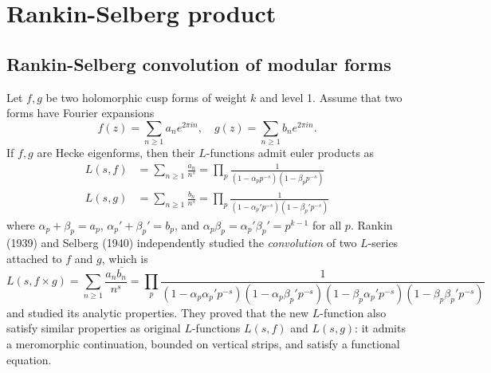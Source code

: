 \section{Rankin-Selberg product}

\subsection{Rankin-Selberg convolution of modular forms}

Let $f, g$ be two holomorphic cusp forms of weight $k$ and level 1.
Assume that two forms have Fourier expansions
$$
    f(z) = \sum_{n\geq 1} a_{n}e^{2\pi i n}, \quad g(z) = \sum_{n\geq 1} b_{n}e^{2\pi i n}.
$$
If $f,g$ are Hecke eigenforms, then their $L$-functions admit euler products as
\begin{align*}
    L(s, f) &= \sum_{n\geq 1}\frac{a_{n}}{n^{s}} = \prod_{p} \frac{1}{(1 - \alpha_{p}p^{-s})(1 - \beta_{p}p^{-s})} \\
    L(s, g) &= \sum_{n\geq 1}\frac{b_{n}}{n^{s}} = \prod_{p} \frac{1}{(1 - \alpha_{p}'p^{-s})(1 - \beta_{p}'p^{-s})}
\end{align*}
where $\alpha_{p} + \beta_{p} = a_{p}$, $\alpha_{p}' + \beta_{p}' = b_{p}$, and $\alpha_{p}\beta_{p} = \alpha_{p}'\beta_{p}' = p^{k-1}$ for all $p$.
Rankin (1939) and Selberg (1940) independently studied the \emph{convolution} of two $L$-series attached to $f$ and $g$, which is
$$
    L(s, f\times g) = \sum_{n\geq 1} \frac{a_{n}\overline{b_{n}}}{n^{s}} = \prod_{p} \frac{1}{(1 - \alpha_{p}\alpha_{p}'p^{-s})(1 - \alpha_{p}\beta_{p}'p^{-s})(1 - \beta_{p}\alpha_{p}'p^{-s})(1 - \beta_{p}\beta_{p}'p^{-s})}
$$
and studied its analytic properties.
They proved that the new $L$-function also satisfy similar properties as original $L$-functions $L(s, f)$ and $L(s, g)$: it admits a meromorphic continuation, bounded on vertical strips,
and satisfy a functional equation.

